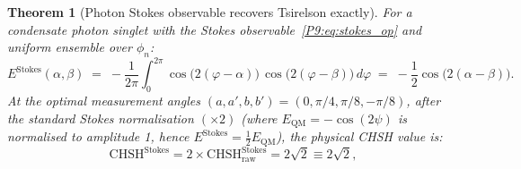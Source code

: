 \documentclass[11pt,a4paper]{article}
\newtheorem{theorem}{Theorem}[section]
\theoremstyle{definition}
\theoremstyle{remark}
\newcommand{\CHSH}{\mathrm{CHSH}}
\newcommand{\Tsirelson}{2\sqrt{2}}
\begin{document}
\begin{theorem}[Photon Stokes observable recovers Tsirelson exactly]
\label{P9:thm:stokes}
For a condensate photon singlet with the Stokes observable~\eqref{P9:eq:stokes_op} and uniform ensemble over $\phi_n$:
\begin{equation}
  E^\mathrm{Stokes}(\alpha,\beta)
  \;=\; -\frac{1}{2\pi}\int_0^{2\pi}
  \cos\bigl(2(\varphi-\alpha)\bigr)\,\cos\bigl(2(\varphi-\beta)\bigr)\,d\varphi
  \;=\; -\frac{1}{2}\cos\bigl(2(\alpha-\beta)\bigr).
  \label{P9:eq:E_stokes}
\end{equation}
At the optimal measurement angles $(a,a',b,b')=(0,\pi/4,\pi/8,-\pi/8)$,
after the standard Stokes normalisation $(\times2)$ (where $E_\mathrm{QM}=-\cos(2\psi)$
is normalised to amplitude 1, hence $E^\mathrm{Stokes} = \tfrac{1}{2}E_\mathrm{QM}$),
the physical CHSH value is:
\begin{equation}
  \boxed{\CHSH^\mathrm{Stokes}
  = 2\times\CHSH^\mathrm{Stokes}_\mathrm{raw}
  = 2\sqrt{2}
  \equiv \Tsirelson},
  \label{P9:eq:stokes_tsirelson}
\end{equation}
\end{theorem}
 
\end{document}
